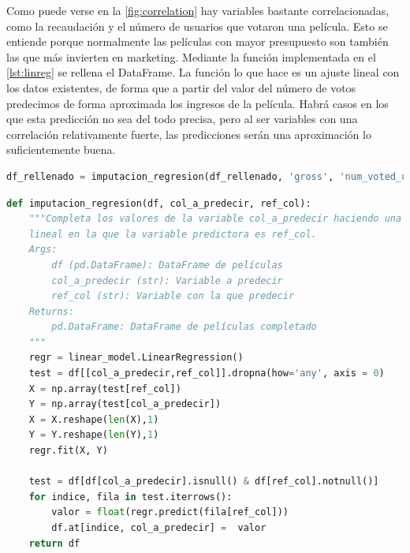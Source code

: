 Como puede verse en la \autoref{fig:correlation} hay variables bastante correlacionadas, como la recaudación y el número de usuarios que votaron una película. Esto se entiende porque normalmente las películas con mayor presupuesto son también las que más invierten en marketing. Mediante la función implementada en el \autoref{lst:linreg} se rellena el DataFrame. La función lo que hace es un ajuste lineal con los datos existentes, de forma que a partir del valor del número de votos predecimos de forma aproximada los ingresos de la película. Habrá casos en los que esta predicción no sea del todo precisa, pero al ser variables con una correlación relativamente fuerte, las predicciones serán una aproximación lo suficientemente buena.

\begin{lstlisting}[language=Python, caption = {Rellenado de la variable de ingresos teniendo en cuenta el número de votos. Para ello, se utiliza la función definida en el \autoref{lst:linreg}.}]
df_rellenado = imputacion_regresion(df_rellenado, 'gross', 'num_voted_users')
\end{lstlisting}

\begin{lstlisting}[language=Python, caption={Imputación de una variable mediante regresión lineal con otra. Tras un análisis de correlación entre variables, es posible rellenar valores faltantes a partir del valor de otra variable que esté estrechamente correlacionada con la que si está informada. Esta función recibe la columna a rellenar y la columna de referencia y mediante una regresión lineal predice los valores faltantes de la columna a rellenar.}, label ={lst:linreg}]
 def imputacion_regresion(df, col_a_predecir, ref_col):
    """Completa los valores de la variable col_a_predecir haciendo una regresión
    lineal en la que la variable predictora es ref_col.
    Args:
        df (pd.DataFrame): DataFrame de películas
        col_a_predecir (str): Variable a predecir
        ref_col (str): Variable con la que predecir
    Returns:
        pd.DataFrame: DataFrame de películas completado
    """
    regr = linear_model.LinearRegression()
    test = df[[col_a_predecir,ref_col]].dropna(how='any', axis = 0)
    X = np.array(test[ref_col])
    Y = np.array(test[col_a_predecir])
    X = X.reshape(len(X),1)
    Y = Y.reshape(len(Y),1)
    regr.fit(X, Y)

    test = df[df[col_a_predecir].isnull() & df[ref_col].notnull()]
    for indice, fila in test.iterrows():
        valor = float(regr.predict(fila[ref_col]))
        df.at[indice, col_a_predecir] =  valor
    return df
\end{lstlisting}

